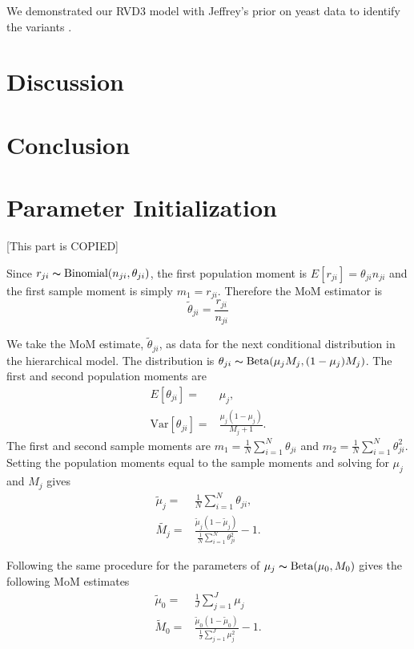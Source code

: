 \documentclass[11pt,reqno]{amsart}
\begin{document}
We demonstrated our RVD3 model with Jeffrey's prior on yeast data to identify the variants \citep{kvitek2013whole}.


\section{Discussion}


\section{Conclusion}


\appendix
\section{Parameter Initialization}\label{sec:appendix_mom}
[This part is COPIED]

Since $r_{ji} \thicksim \text{Binomial}(n_{ji}, \theta_{ji})$, the first population moment is  $E[r_{ji}] = \theta_{ji} n_{ji}$ and the first sample moment is simply $m_1 = r_{ji}$.
Therefore the MoM estimator is
\begin{equation}
	\tilde{\theta}_{ji} = \frac{r_{ji}} {n_{ji}}
\end{equation}

We take the MoM estimate, $\tilde{\theta}_{ji}$, as data for the next conditional distribution in the hierarchical model.
The distribution is $\theta_{ji} \thicksim \text{Beta}(\mu_jM_j, (1-\mu_j)M_j)$. The first and second population moments are
\begin{eqnarray}
	E[\theta_{ji}] =& \mu_j,\\
	\text{Var}[\theta_{ji}] =& \frac{\mu_j(1-\mu_j)} { M_j + 1 }.
\end{eqnarray}
The first and second sample moments are $m_1 = \frac{1}{N}\sum_{i=1}^N \theta_{ji}$ and $m_2 = \frac{1}{N}\sum_{i=1}^N \theta_{ji}^2$.
Setting the population moments equal to the sample moments and solving for $\mu_j$ and $M_j$ gives
\begin{eqnarray}
	\tilde{\mu}_j =& \frac{1}{N} \sum_{i=1}^N \theta_{ji}, \\
	\tilde{M_j} =& \frac{ \tilde{\mu}_j (1 - \tilde{\mu}_j ) } { \frac{1}{N} \sum_{i=1}^N \theta_{ji}^2 } -1.
\end{eqnarray}

Following the same procedure for the parameters of $\mu_j \thicksim \text{Beta}(\mu_0, M_0)$ gives the following MoM estimates
\begin{eqnarray}
	\tilde{\mu}_0 =& \frac{1}{J} \sum_{j=1}^J \mu_j \\
	\tilde{M}_0 =& \frac{ \tilde{\mu}_0 (1 - \tilde{\mu}_0 ) } {\frac{1}{J} \sum_{j=1}^J \mu_j^2 } -1.
\end{eqnarray}
\end{document}
